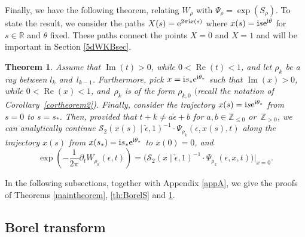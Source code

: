 \documentclass[pdftex]{sigma}
\numberwithin{equation}{section}
\newtheorem{Theorem}{Theorem}[section]
\begin{document}
Finally, we have the following theorem, relating $W_{\rho}$ with $\Psi_{\rho}=\exp(S_{\rho})$.
To state the result, we consider the paths $X(s)={\rm e}^{2\pi \mathrm{i} x(s)}$ where $x(s)=\mathrm{i} s{\rm e}^{\mathrm{i}\theta}$ for $s\in \mathbb{R}$ and $\theta$ fixed. These paths connect the points $X=0$ and $X=1$ and will be important in Section \ref{5dWKBsec}.

\begin{Theorem}\label{theorem3}
Assume that $\operatorname{Im}(t)>0$, while $0<\operatorname{Re}(t)<1$, and let $\rho_k$ be a ray between $l_k$ and~$l_{k-1}$. Furthermore, pick $x=\mathrm{i} s_*{\rm e}^{\mathrm{i} \theta_*}$ such that $\operatorname{Im}(x)>0$, while $0<\operatorname{Re}(x)<1$, and~$\rho_k$ is of the form $\rho_{k,0}$ $($recall the notation of Corollary~{\rm \ref{cortheorem2})}. Finally, consider the trajectory $x(s)=\mathrm{i} s{\rm e}^{\mathrm{i}\theta_*}$ from $s=0$ to $s=s_*$. Then, provided that $t+k\neq a\check{\epsilon}+b$ for $a,b\in \mathbb{Z}_{\leq 0}$ or~$\mathbb{Z}_{> 0}$, we can analytically continue $\mathcal{S}_2(x(s)\mid \check\epsilon,1)^{-1}\cdot\Psi_{\rho_k}(\epsilon,x(s),t)$ along the trajectory $x(s)$ from $x(s_*)=\mathrm{i} s_*{\rm e}^{\mathrm{i}\theta_*}$ to $x(0)=0$, and
\begin{equation*}
 \exp\left(-\frac{1}{2\pi}\partial_tW_{\rho_k}(\epsilon,t)\right)=\big(\mathcal{S}_2(x\mid \check\epsilon,1)^{-1}\cdot \Psi_{\rho_k}(\epsilon,x,t)\big)\big|_{x=0}.
\end{equation*}
\end{Theorem}

In the following subsections, together with Appendix \ref{appA}, we give the proofs of Theorems \ref{maintheorem}, \ref{th:BorelS} and \ref{theorem3}.

\subsection{Borel transform}\label{BTsect}
\end{document}
